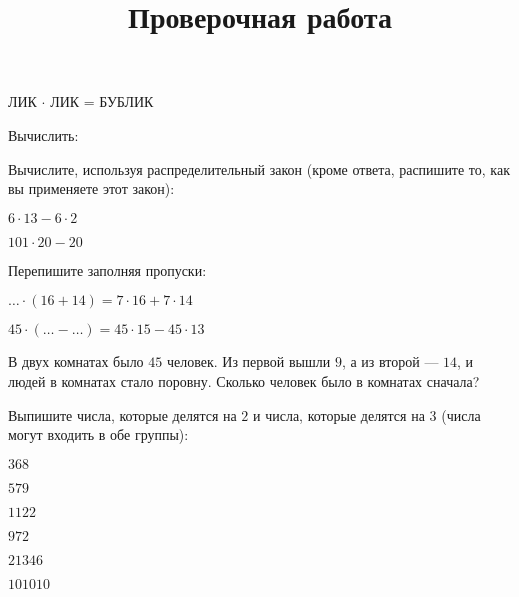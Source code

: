 \begin{class}[number=1]
\begin{listofex}
\begin{enumcols}[itemcolumns=2]
		\item ЛИК \( \cdot \) ЛИК = БУБЛИК
	\end{enumcols}
\end{listofex}
\newpage
\title{Проверочная работа}
\begin{listofex}
	\item Вычислить:
	\begin{enumcols}[itemcolumns=1]
		\item {}
		\item {}
	\end{enumcols}
	\item Вычислите, используя распределительный закон (кроме ответа, распишите то, как вы применяете этот закон):
	\begin{enumcols}[itemcolumns=2]
		\item \( 6\cdot13-6\cdot2 \)
		\item \( 101\cdot20-20 \)
	\end{enumcols}
	\item Перепишите заполняя пропуски:
	\begin{enumcols}[itemcolumns=2]
		\item \( {\dots}\cdot(16+14)=7\cdot16+7\cdot14 \)
		\item \( 45\cdot({\dots}-{\dots})=45\cdot15-45\cdot13 \)
	\end{enumcols}
	\item В двух комнатах было \( 45 \) человек. Из первой вышли \( 9 \), а из второй --- \( 14 \), и людей в комнатах стало поровну. Сколько человек было в комнатах сначала?
	\item Выпишите числа, которые делятся на \( 2 \) и числа, которые делятся на \( 3 \) (числа могут входить в обе группы):
	\begin{enumcols}[itemcolumns=6]
		\item \( 368 \)
		\item \( 579 \)
		\item \( 1122 \)
		\item \( 972 \)
		\item \( 21346\)
		\item \( 101010 \)

\end{enumcols}
\end{listofex}
\end{class}
